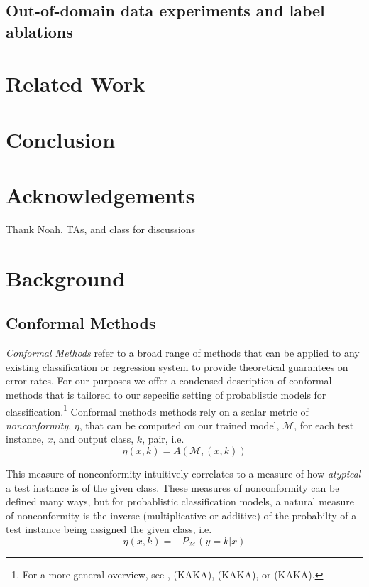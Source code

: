 \documentclass[11pt,letterpaper]{article}
\newcommand{\mc}{\mathcal}
\begin{document}
\subsection{Out-of-domain data experiments and label ablations}

\section{Related Work}

\section{Conclusion}

\newpage
\section{Acknowledgements}
Thank Noah, TAs, and class for discussions


\label{lastpage}

\newpage
\appendix
\section{Background}
\subsection{Conformal Methods}
\textit{Conformal Methods} refer to a broad range of methods that can be applied to any existing classification or regression system to provide theoretical guarantees on error rates. For our purposes we offer a condensed description of conformal methods that is tailored to our sepecific setting of probablistic models for classification.\footnote{For a more general overview, see \citet{card.2019}, (KAKA), (KAKA), or (KAKA).} Conformal methods methods rely on a scalar metric of \textit{nonconformity}, $\eta$, that can be computed on our trained model, $\mc{M}$, for each test instance, $x$, and output class, $k$, pair, i.e.
\begin{equation}
\eta(x, k) = A(\mc{M}, (x, k))
\end{equation}

This measure of nonconformity intuitively correlates to a measure of how \textit{atypical} a test instance is of the given class. These measures of nonconformity can be defined many ways, but for probablistic classification models, a natural measure of nonconformity is the inverse (multiplicative or additive) of the probabilty of a test instance being assigned the given class, i.e.
\begin{equation} \label{inv.prob}
\eta(x, k) = -P_{\mc{M}}(y = k | x)
\end{equation}
\end{document}
